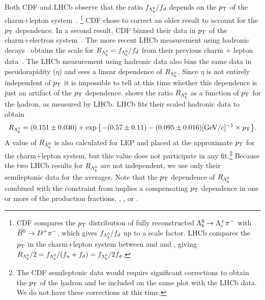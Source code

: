 Both CDF and LHCb observe that the ratio $f_{\Lambda_b^0}/f_{d}$ depends on the $p_{\rm T}$
of the charm+lepton system~\cite{Aaltonen:2008eu,Aaij:2011jp}.
\footnote{
  \label{foot:life_mix:Aaltonen:2008eu}
  CDF compares the $p_{\rm T}$ distribution of fully reconstructed 
  $\Lambda_b^0\to\Lambda_c^+ \pi^-$ 
  with $\kern 0.18em\overline{\kern -0.18em B}{}^0\rightarrow D^+\pi^-$, which 
  gives $f_{\Lambda_b^0}/f_{d}$ up to a scale factor. LHCb compares the $p_{\rm T}$ 
  in the charm+lepton system between \Lb and \Bd and \Bu, giving
  $R_{\Lambda_b^0}/2 = f_{\Lambda_b^0}/(f_{u}+f_{d}) = f_{\Lambda_b^0}/2f_{d}$.}
CDF chose to correct an older result to account for the $p_{\rm T}$ dependence.
In a second result, CDF binned their data in $p_{\rm T}$ of the charm+electron 
system~\cite{Aaltonen:2008zd}.
The more recent LHCb measurement using hadronic decays~\cite{Aaij:2014jyk} 
obtains the scale for $R_{\Lambda_b^0} = f_{\Lambda_b^0}/f_{d}$ from their previous 
charm + lepton data~\cite{Aaij:2011jp}.  The LHCb measurement using hadronic
data also bins the same data in pseudorapidity ($\eta$) and sees a 
linear dependence of $R_{\Lambda_b^0}$.  Since $\eta$ is not entirely
independent of $p_{\rm T}$ it is impossible to tell at this time whether 
this dependence is just an artifact of the $p_{\rm T}$ dependence.
 shows the ratio $R_{\Lambda_b^0}$ as a function of 
$p_{\rm T}$ for the \b hadron, as measured by LHCb.  LHCb fits their
scaled hadronic data to obtain
\begin{equation}
R_{\Lambda_b^0} = (0.151\pm 0.030) + 
  \exp{\left\{-(0.57\pm 0.11) - 
  (0.095\pm 0.016)[{\rm GeV}/c]^{-1} \times p_{\rm T}\right\}}.
\end{equation}
A value of
$R_{\Lambda_b^0}$ is also calculated for LEP and placed at the approximate $p_{\rm T}$ for the charm+lepton
system, but this value does not participate in any fit.\footnote{
  \label{foot:life_mix:Aaltonen:2008zd}
  The CDF semileptonic data would require significant corrections to obtain the $p_{\rm T}$ of the \b hadron and be included on the same plot with the LHCb data.
  We do not have these corrections at this time.}
Because the two LHCb results for $R_{\Lambda_b^0}$ are not 
independent, we use only their semileptonic data for the averages.
Note that the $p_{\rm T}$ dependence
of $R_{\Lambda_b^0}$ combined with the constraint from  implies
a compensating $p_{\rm T}$ dependence in one or more of the production fractions, \fBu, \fBd,
or \fBs.

